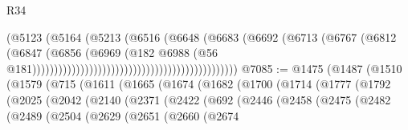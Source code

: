 \begin{lexlean}{R34}
\begin{coremodule}
                                                                    (@5123
                                                                      (@5164
                                                                        (@5213
                                                                          (@6516
                                                                            (@6648
                                                                              (@6683
                                                                                (@6692
                                                                                  (@6713
                                                                                    (@6767
                                                                                      (@6812
                                                                                        (@6847
                                                                                          (@6856
                                                                                            (@6969
                                                                                              (@182
                                                                                                @6988
                                                                                                (@56
                                                                                                  @181)))))))))))))))))))))))))))))))))))))))))))))))
@7085 := @1475
    (@1487
      (@1510
        (@1579
          (@715
            (@1611
              (@1665
                (@1674
                  (@1682
                    (@1700
                      (@1714
                        (@1777
                          (@1792
                            (@2025
                              (@2042
                                (@2140
                                  (@2371
                                    (@2422
                                      (@692
                                        (@2446
                                          (@2458
                                            (@2475
                                              (@2482
                                                (@2489
                                                  (@2504
                                                    (@2629
                                                      (@2651
                                                        (@2660
                                                          (@2674

\end{coremodule}
\end{lexlean}
